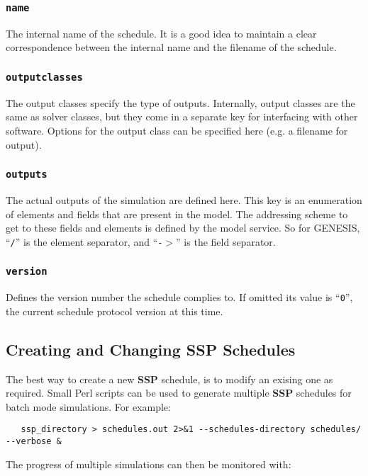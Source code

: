 \documentclass[12pt]{article}
\begin{document}
\subsubsection*{\tt name}

The internal name of the schedule. It is a good idea to maintain a clear correspondence between the internal name and the filename of the schedule. 

\subsubsection*{\tt outputclasses}

The output classes specify the type of outputs. Internally, output classes are the same as solver classes, but they come in a separate key for interfacing with other software. Options for the output class can be specified here (e.g. a filename for output). 

\subsubsection*{\tt outputs}

The actual outputs of the simulation are defined here. This key is an enumeration of elements and fields that are present in the model. The addressing scheme to get to these fields and elements is defined by the model service. So for GENESIS, ``{\tt /}'' is the element separator, and ``{\tt -$>$}'' is the field separator. 

\subsubsection*{\tt version}

Defines the version number the schedule complies to. If omitted its value is ``{\tt 0}'', the current schedule protocol version at this time. 

\subsection*{Creating and Changing SSP Schedules}

The best way to create a new {\bf SSP} schedule, is to modify an exising one as required. Small Perl scripts can be used to generate multiple {\bf SSP} schedules for batch mode simulations. For example:

\begin{verbatim}
   ssp_directory > schedules.out 2>&1 --schedules-directory schedules/ --verbose &
\end{verbatim}
The progress of multiple simulations can then be monitored with:
\end{document}
